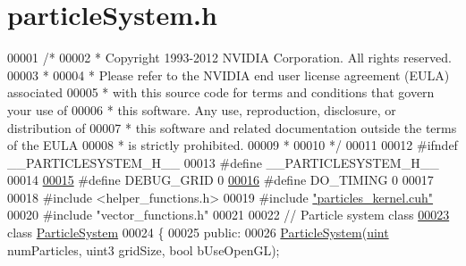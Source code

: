 \hypertarget{particle_system_8h_source}{\section{particle\-System.\-h}
}

\begin{DoxyCode}
00001 \textcolor{comment}{/*}
00002 \textcolor{comment}{ * Copyright 1993-2012 NVIDIA Corporation.  All rights reserved.}
00003 \textcolor{comment}{ *}
00004 \textcolor{comment}{ * Please refer to the NVIDIA end user license agreement (EULA) associated}
00005 \textcolor{comment}{ * with this source code for terms and conditions that govern your use of}
00006 \textcolor{comment}{ * this software. Any use, reproduction, disclosure, or distribution of}
00007 \textcolor{comment}{ * this software and related documentation outside the terms of the EULA}
00008 \textcolor{comment}{ * is strictly prohibited.}
00009 \textcolor{comment}{ *}
00010 \textcolor{comment}{ */}
00011 
00012 \textcolor{preprocessor}{#}\textcolor{preprocessor}{ifndef} \textcolor{preprocessor}{\_\_PARTICLESYSTEM\_H\_\_}
00013 \textcolor{preprocessor}{#}\textcolor{preprocessor}{define} \textcolor{preprocessor}{\_\_PARTICLESYSTEM\_H\_\_}
00014 
\hypertarget{particle_system_8h_source_l00015}{}\hyperlink{particle_system_8h_ae8e259f1517dc644367009cfc06caebe}{00015} \textcolor{preprocessor}{#}\textcolor{preprocessor}{define} \textcolor{preprocessor}{DEBUG\_GRID} 0
\hypertarget{particle_system_8h_source_l00016}{}\hyperlink{particle_system_8h_a55968a72af09a67a7420f59ee7435ea3}{00016} \textcolor{preprocessor}{#}\textcolor{preprocessor}{define} \textcolor{preprocessor}{DO\_TIMING} 0
00017 
00018 \textcolor{preprocessor}{#}\textcolor{preprocessor}{include} \textcolor{preprocessor}{<}\textcolor{preprocessor}{helper\_functions}\textcolor{preprocessor}{.}\textcolor{preprocessor}{h}\textcolor{preprocessor}{>}
00019 \textcolor{preprocessor}{#}\textcolor{preprocessor}{include} \hyperlink{particles__kernel_8cuh}{"particles\_kernel.cuh"}
00020 \textcolor{preprocessor}{#}\textcolor{preprocessor}{include} \textcolor{preprocessor}{"vector\_functions.h"}
00021 
00022 \textcolor{comment}{// Particle system class}
\hypertarget{particle_system_8h_source_l00023}{}\hyperlink{class_particle_system}{00023} \textcolor{keyword}{class} \hyperlink{class_particle_system}{ParticleSystem}
00024 \{
00025     \textcolor{keyword}{public}:
00026         \hyperlink{class_particle_system_a8a2be3e93616aa694801369c8b8d12cb}{ParticleSystem}(\hyperlink{particles__kernel_8cuh_a91ad9478d81a7aaf2593e8d9c3d06a14}{uint} numParticles, uint3 gridSize, \textcolor{keywordtype}{bool} bUseOpenGL);

\end{DoxyCode}
